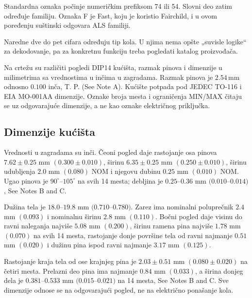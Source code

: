 Standardna oznaka počinje numeričkim prefiksom 74 ili 54. Slovni deo zatim određuje familiju. Oznaka F je Fast, koju je koristio Fairchild, i u ovom poređenju suštinski odgovara ALS familiji.

Naredne dve do pet cifara određuju tip kola. U njima nema opšte „suvisle logike“ za dekodovanje, pa za konkretnu funkciju treba pogledati katalog proizvođača.

Na crtežu su različiti pogledi DIP14 kućišta, razmak pinova i dimenzije u milimetrima sa vrednostima u inčima u zagradama. Razmak pinova je $2.54\,\mathrm{mm}$ odnosno $0.100$ inča, T. P. (See Note A). Kućište potpada pod JEDEC TO-116 i EIA MO-001AA dimenzije. Oznake broja mesta i ograničenja MIN/MAX čitaju se uz odgovarajuće dimenzije, a ne kao oznake električnog priključka.

\subsection*{Dimenzije kućišta}
Vrednosti u zagradama su inči. Čeoni pogled daje rastojanje osa pinova $7.62\pm0.25$ mm $(0.300\pm0.010)$, širinu $6.35\pm0.25$ mm $(0.250\pm0.010)$, širinu udubljenja $2.0$ mm $(0.080)$ NOM i njegovu dubinu $0.25$ mm $(0.010)$ NOM. Ugao pinova je $90^\circ$–$105^\circ$ na svih 14 mesta; debljina je $0.25$–$0.36$ mm $(0.010$–$0.014)$, See Notes B and C.

Dužina tela je $18.0$–$19.8$ mm $(0.710$–$0.780)$. Zarez ima nominalni poluprečnik $2.4$ mm $(0.093)$ i nominalnu širinu $2.8$ mm $(0.110)$. Bočni pogled daje visinu do ravni naleganja najviše $5.08$ mm $(0.200)$, širinu ramena pina najviše $1.78$ mm $(0.070)$ na svih 14 mesta, rastojanje donje površine tela od ravni najmanje $0.51$ mm $(0.020)$ i dužinu pina ispod ravni najmanje $3.17$ mm $(0.125)$.

Rastojanje kraja tela od ose krajnjeg pina je $2.03\pm0.51$ mm $(0.080\pm0.020)$ na četiri mesta. Prelazni deo pina ima najmanje $0.84$ mm $(0.033)$, a širina donjeg dela je $0.381$–$0.533$ mm $(0.015$–$0.021)$ na 14 mesta, See Notes B and C. Sve dimenzije odnose se na odgovarajući pogled, ne na električno ponašanje kola.
